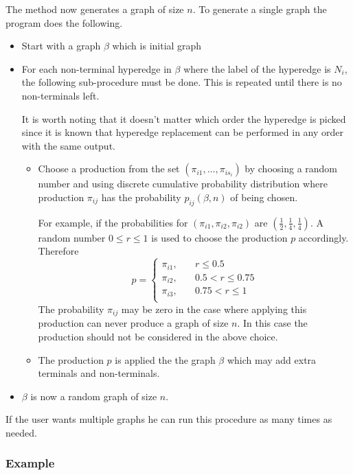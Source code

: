   The method now generates a graph of size $n$. To generate a single graph the program does the following.

  \begin{itemize}
    \item Start with a graph $\beta$ which is initial graph 
    \item For each non-terminal hyperedge in $\beta$ where the label of the hyperedge is $N_i$, the following sub-procedure must be done. This is repeated until there is no non-terminals left.

    It is worth noting that it doesn't matter which order the hyperedge is picked since it is known that hyperedge replacement can be performed in any order with the same output.
    \begin{itemize}
    \item Choose a production from the set $\left(\pi_{i1},\dots,\pi_{is_i}\right)$ by choosing a random number and using discrete cumulative probability distribution where production $\pi_{ij}$ has the probability $p_{ij}(\beta, n)$ of being chosen.

    For example, if the probabilities for $(\pi_{i1}, \pi_{i2}, \pi_{i2})$ are $(\frac{1}{2}, \frac{1}{4}, \frac{1}{4})$. A random number $0 \leq r \leq 1$ is used to choose the production $p$ accordingly. Therefore
    \[
    p = \left\{\begin{aligned}
      \pi_{i1}, \quad & r \le 0.5 \\
      \pi_{i2}, \quad & 0.5 < r \le 0.75 \\
      \pi_{i3}, \quad & 0.75 < r \le 1 \\
    \end{aligned}\right.
    \]
    The probability $\pi_{ij}$ may be zero in the case where applying this production can never produce a graph of size $n$. In this case the production should not be considered in the above choice.

    \item The production $p$ is applied the the graph $\beta$ which may add extra terminals and non-terminals.
    \end{itemize}

    \item $\beta$ is now a random graph of size $n$. 
  \end{itemize}

  If the user wants multiple graphs he can run this procedure as many times as needed.

\subsubsection{Example}

